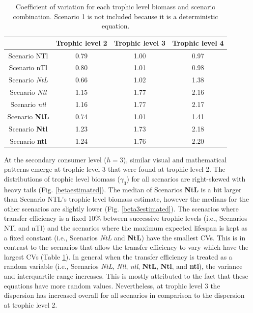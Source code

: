 \documentclass[oneside,12pt,final]{sty/ucthesis-CA2012}
\begin{document}
\begin{mainmatter}
\begin{table}[ht]
\centering
\caption{Coefficient of variation for each trophic level biomass and scenario combination. Scenario 1 is not included because it is a deterministic equation.}
\begin{tabular}{cccc}
  \hline
 & Trophic level 2 & Trophic level 3 & Trophic level 4 \\ 
  \hline
  Scenario NTl & 0.79 & 1.00 & 0.97 \\ 
  Scenario nTl & 0.80 & 1.01 & 0.98 \\ 
  Scenario \textit{NtL} & 0.66 & 1.02 & 1.38 \\ 
  Scenario \textit{Ntl} & 1.15 & 1.77 & 2.16 \\ 
  Scenario \textit{ntl} & 1.16 & 1.77 & 2.17 \\ 
  Scenario \textbf{NtL} & 0.74 & 1.01 & 1.41 \\ 
  Scenario \textbf{Ntl} & 1.23 & 1.73 & 2.18 \\ 
  Scenario \textbf{ntl} & 1.24 & 1.76 & 2.20 \\ 
   \hline
\end{tabular}
\label{cv}
\end{table}

At the secondary consumer level ($h=3$), similar visual and mathematical patterns emerge at trophic level 3 that were found at trophic level 2. The distributions of trophic level biomass ($\gamma_3$) for all scenarios are right-skewed with heavy tails (Fig. \ref{betaestimated}). The median of Scenarios \textbf{NtL} is a bit larger than Scenario NTL's trophic level biomass estimate, however the medians for the other scenarios are slightly lower (Fig. \ref{beta3estimated}). The scenarios where transfer efficiency is a fixed 10\% between successive trophic levels (i.e., Scenarios NTl and nTl) and the scenarios where the maximum expected lifespan is kept as a fixed constant (i.e., Scenarios \textit{NtL} and \textbf{NtL}) have the smallest CVs. This is in contrast to the scenarios that allow the transfer efficiency to vary which have the largest CVs (Table \ref{cv}). In general when the transfer efficiency is treated as a random variable (i.e., Scenarios \textit{NtL}, \textit{Ntl}, \textit{ntl}, \textbf{NtL}, \textbf{Ntl}, and \textbf{ntl}), the variance and interquartile range increases. This is mostly attributed to the fact that these equations have more random values. Nevertheless, at trophic level 3 the dispersion has increased overall for all scenarios in comparison to the dispersion at trophic level 2. 


\end{mainmatter}
\end{document}
